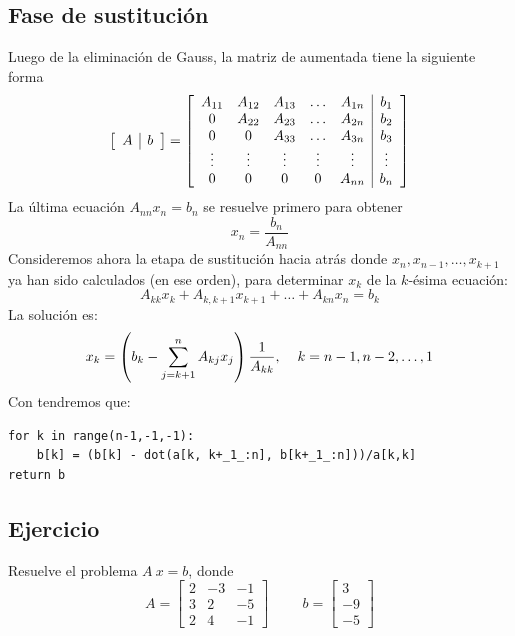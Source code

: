 \subsection{Fase de sustitución}
Luego de la eliminación de Gauss, la matriz de aumentada tiene la siguiente forma
\[ \left[ \begin{array}{c | c}
A & b 
\end{array} \right] =
\left[ \begin{array}{c c c c c | c}
A_{11} & A_{12} & A_{13} & \ldots & A_{1n} & b_{1} \\
0      & A_{22} & A_{23} & \ldots & A_{2n} & b_{2} \\
0 	   & 0      & A_{33} & \ldots & A_{3n} & b_{3} \\
\vdots & \vdots & \vdots & \vdots & \vdots & \vdots \\
0      & 0      & 0      & 0      & A_{nn} & b_{n}
\end{array} \right] \]
La última ecuación $A_{nn} x_{n} = b_{n}$ se resuelve primero para obtener
\[ x_{n} = \dfrac{b_{n}}{A_{nn}}\]
Consideremos ahora la etapa de sustitución hacia atrás donde $x_{n}, x_{n-1}, \ldots,x_{k + 1}$ ya han sido calculados (en ese orden), para determinar $x_{k}$ de la $k$-ésima ecuación:
\[ A_{kk} x_{k} + A_{k,k+1} x_{k+1} + \ldots + A_{kn}x_{n} = b_{k}\]
La solución es:
\[ x_{k} = \left( b_{k} - \sum_{j=k+1}^{n} A_{kj}x_{j} \right) \dfrac{1}{A_{kk}}, \hspace{0.4cm} k=n-1,n-2,\ldots,1 \]
Con \python{} tendremos que:
\begin{lstlisting}[caption=Fase de sustitución, style=FormattedNumber, basicstyle=\linespread{1.1}\ttfamily=\small, columns=fullflexible]
for k in range(n-1,-1,-1):
    b[k] = (b[k] - dot(a[k, k+_1_:n], b[k+_1_:n]))/a[k,k]
return b
\end{lstlisting}
\subsection*{Ejercicio}
Resuelve el problema $A \: x=b$, donde
\[ A = \begin{bmatrix}
2 & -3 & -1 \\
3 & 2 & -5 \\
2 & 4 & -1
\end{bmatrix}
\hspace{1cm} b=
\begin{bmatrix}
3 \\
-9 \\
-5
\end{bmatrix} \]
